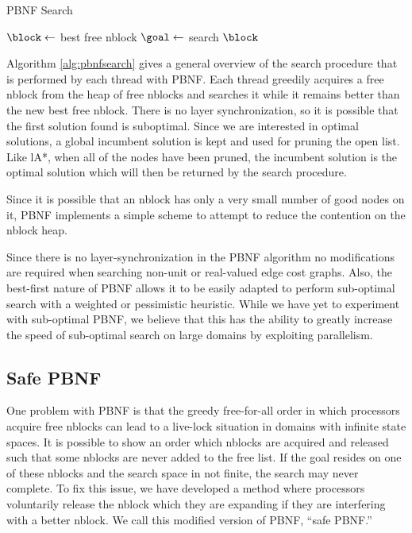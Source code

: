 \documentclass{article}
\begin{document}
\begin{algorithm}
  \caption{PBNF Search}
  \label{alg:pbnfsearch}
   {
    $\block \leftarrow$ best free nblock\;
     {
      $\goal \leftarrow$ search $\block$\;
    }
  }
\end{algorithm}

Algorithm \ref{alg:pbnfsearch} gives a general overview of the search
procedure that is performed by each thread with PBNF.  Each thread
greedily acquires a free nblock from the heap of free nblocks and
searches it while it remains better than the new best free nblock.
There is no layer synchronization, so it is possible that the first
solution found is suboptimal.  Since we are interested in optimal
solutions, a global incumbent solution is kept and used for pruning
the open list.  Like lA*, when all of the nodes have been pruned, the
incumbent solution is the optimal solution which will then be returned
by the search procedure.

Since it is possible that an nblock has only a very small number of
good nodes on it, PBNF implements a simple scheme to attempt to reduce
the contention on the nblock heap.

Since there is no layer-synchronization in the PBNF algorithm no
modifications are required when searching non-unit or real-valued edge
cost graphs.  Also, the best-first nature of PBNF allows it to be
easily adapted to perform sub-optimal search with a weighted or
pessimistic heuristic.  While we have yet to experiment with
sub-optimal PBNF, we believe that this has the ability to greatly
increase the speed of sub-optimal search on large domains by
exploiting parallelism.

\subsection{Safe PBNF}

One problem with PBNF is that the greedy free-for-all order in which
processors acquire free nblocks can lead to a live-lock situation in
domains with infinite state spaces.  It is possible to show an order
which nblocks are acquired and released such that some nblocks are
never added to the free list.  If the goal resides on one of these
nblocks and the search space in not finite, the search may never
complete.  To fix this issue, we have developed a method where
processors voluntarily release the nblock which they are expanding if
they are interfering with a better nblock.  We call this modified
version of PBNF, ``safe PBNF.''
\end{document}
